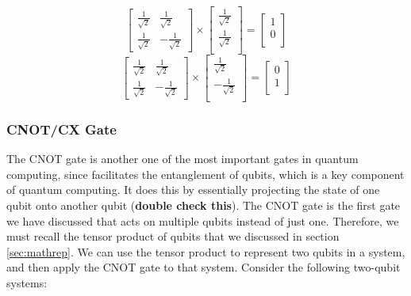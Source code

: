 \documentclass{article}
\begin{document}
\[
	\begin{bmatrix}
		\frac{1}{\sqrt{2}} & \frac{1}{\sqrt{2}} \\
		\frac{1}{\sqrt{2}} & -\frac{1}{\sqrt{2}}
	\end{bmatrix}
	\times
	\begin{bmatrix}
		\frac{1}{\sqrt{2}} \\
		\frac{1}{\sqrt{2}} \\
	\end{bmatrix}
	=
	\begin{bmatrix}
		1 \\
		0 \\
	\end{bmatrix}
\]
\[
	\begin{bmatrix}
		\frac{1}{\sqrt{2}} & \frac{1}{\sqrt{2}} \\
		\frac{1}{\sqrt{2}} & -\frac{1}{\sqrt{2}}
	\end{bmatrix}
	\times
	\begin{bmatrix}
		\frac{1}{\sqrt{2}} \\
		-\frac{1}{\sqrt{2}} \\
	\end{bmatrix}
	=
	\begin{bmatrix}
		0 \\
		1 \\
	\end{bmatrix}
\]

\subsubsection{CNOT/CX Gate}
\label{sec:cnotgate}

The CNOT gate is another one of the most important gates in quantum computing, since facilitates the entanglement of qubits, which is a key component of quantum computing. It does
this by essentially projecting the state of one qubit onto another qubit (\textbf{double check this}). The CNOT gate is the first gate we have discussed that acts on multiple
qubits instead of just one. Therefore, we must recall the tensor product of qubits that we discussed in section \ref{sec:mathrep}. We can use the tensor product to represent 
two qubits in a system, and then apply the CNOT gate to that system. Consider the following two-qubit systems:
\end{document}
